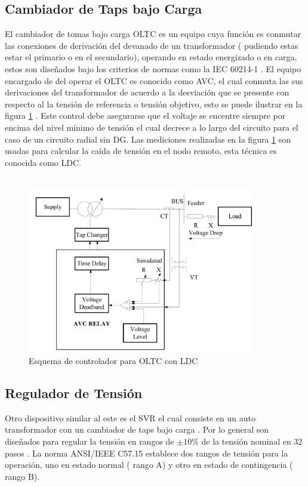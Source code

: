 \documentclass[12pt, letterpaper]{report}
\begin{document}
 \subsection{Cambiador de Taps bajo Carga}
El cambiador de tomas bajo carga \ac{OLTC} es un equipo  cuya función es conmutar las conexiones de derivación del devanado de un transformador ( pudiendo estas estar el primario o en el secundario), operando  en estado energizado o en carga, estos son diseñados bajo los criterios de normas como la  IEC 60214-1 \cite{IEC60214}.
El equipo encargado de del operar el \ac{OLTC} es conocido como \ac{AVC}, el cual conmuta las sus derivaciones del transformador de acuerdo a la desviación que se presente con respecto al la tensión de referencia o tensión objetivo, esto se puede ilustrar en la figura \ref{fig:esqusema_LDC} \cite{Sarimuthu2016}. Este control debe asegurarse que el voltaje se encentre siempre por encima del nivel mínimo de tensión el cual decrece a lo largo del circuito \cite{Sarimuthu2016} para el caso de un circuito radial sin DG. Las  mediciones realizadas en la figura \ref{fig:esqusema_LDC} son usadas para calcular la caída de tensión en el nodo remoto, esta técnica es conocida como \ac{LDC}.\\\\

\begin{figure}
\centering
\caption{Esquema de controlador para OLTC con LDC \cite{Sarimuthu2016}}
\label{fig:esqusema_LDC}
\includegraphics[width=10cm]{imagenes/cap_2/LDC}
\end{figure}


\subsection{Regulador de Tensión}
Otro dispositivo similar al este es el \ac{SVR} el cual consiste en un auto transformador con un cambiador de taps  bajo carga \cite{Vkdulqj}. Por lo general son diseñados para regular la tensión en rangos de $\pm 10 \%$ de la tensión nominal en 32 pasos \cite{kersting2009modeling} \cite{farag2012incorporating}. La norma ANSI/IEEE C57.15 establece dos rangos de tensión para la operación, uno en estado normal ( rango A) y otro en estado de contingencia ( rango B).
\end{document}
